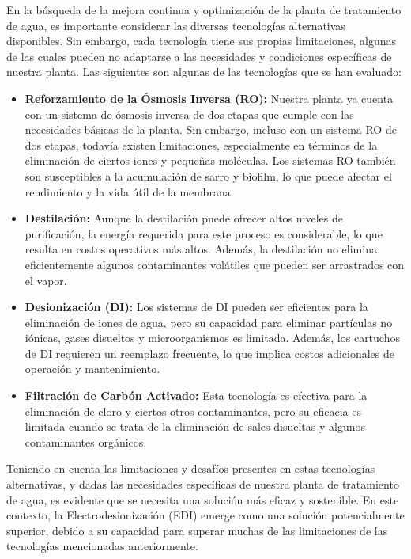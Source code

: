 En la búsqueda de la mejora continua y optimización de la planta de tratamiento de agua,
es importante considerar las diversas tecnologías alternativas disponibles.
Sin embargo, cada tecnología tiene sus propias limitaciones, algunas de las
cuales pueden no adaptarse a las necesidades y condiciones específicas de nuestra planta.
Las siguientes son algunas de las tecnologías que se han evaluado:

\begin{itemize}
      \item \textbf{Reforzamiento de la Ósmosis Inversa (RO):}  Nuestra planta ya cuenta con
            un sistema de ósmosis inversa de dos etapas que cumple con las necesidades
            básicas de la planta. Sin embargo, incluso con un sistema RO de dos etapas,
            todavía existen limitaciones, especialmente en términos de la eliminación de
            ciertos iones y pequeñas moléculas. Los sistemas RO también son susceptibles a
            la acumulación de sarro y biofilm, lo que puede afectar el rendimiento y
            la vida útil de la membrana.

      \item \textbf{Destilación:}  Aunque la destilación puede ofrecer altos niveles de
            purificación, la energía requerida para este proceso es considerable,
            lo que resulta en costos operativos más altos. Además, la destilación
            no elimina eficientemente algunos contaminantes volátiles que pueden ser arrastrados con el vapor.

      \item \textbf{Desionización (DI): } Los sistemas de DI pueden ser eficientes para
            la eliminación de iones de agua, pero su capacidad para eliminar
            partículas no iónicas, gases disueltos y microorganismos es limitada.
            Además, los cartuchos de DI requieren un reemplazo frecuente, lo que
            implica costos adicionales de operación y mantenimiento.

      \item \textbf{Filtración de Carbón Activado:}  Esta tecnología es efectiva para la
            eliminación de cloro y ciertos otros contaminantes, pero su eficacia es
            limitada cuando se trata de la eliminación de sales disueltas y
            algunos contaminantes orgánicos.

\end{itemize}

Teniendo en cuenta las limitaciones y desafíos presentes en estas tecnologías alternativas, y
dadas las necesidades específicas de nuestra planta de tratamiento de agua, es evidente que se
necesita una solución más eficaz y sostenible. En este contexto, la Electrodesionización (EDI)
emerge como una solución potencialmente superior, debido a su capacidad para superar muchas de las
limitaciones de las tecnologías mencionadas anteriormente.

